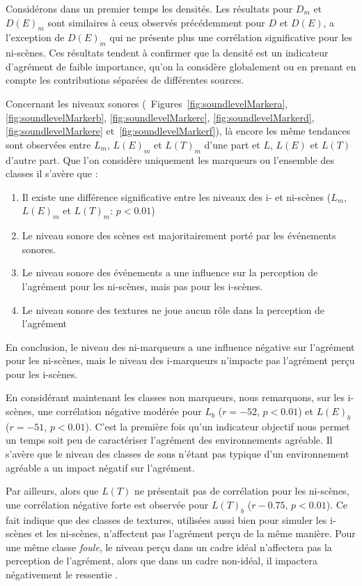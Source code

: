 Considérons dans un premier temps les densités. Les résultats pour $D_m$ et $D(E)_m$ sont similaires à ceux observés précédemment pour $D$ et $D(E)$, a l'exception de $D(E)_m$  qui ne présente plus une corrélation significative pour les ni-scènes. Ces résultats tendent à confirmer que la densité est un indicateur d'agrément de faible importance, qu'on la considère globalement ou en prenant en compte les contributions séparées de différentes sources.


Concernant les niveaux sonores (\Cf~Figures~\ref{fig:soundlevelMarkera}, \ref{fig:soundlevelMarkerb}, \ref{fig:soundlevelMarkerc}, \ref{fig:soundlevelMarkerd}, \ref{fig:soundlevelMarkere} et~\ref{fig:soundlevelMarkerf}), là encore les même tendances sont observées entre $L_m$, $L(E)_m$ et $L(T)_m$ d'une part et $L$, $L(E)$ et $L(T)$ d'autre part. Que l'on considère uniquement les marqueurs ou l'ensemble des classes il s'avère que :

\begin{enumerate}
\item Il existe une différence significative entre les niveaux des i- et ni-scènes ($L_m$, $L(E)_m$ et $L(T)_m$: $p<0.01$) 
\item Le niveau sonore des scènes est majoritairement porté par les événements sonores.
\item Le niveau sonore des événements a une influence sur la perception de l'agrément pour les ni-scènes, mais pas pour les i-scènes.
\item Le niveau sonore des textures ne joue aucun rôle dans la perception de l'agrément
\end{enumerate}

En conclusion, le niveau des ni-marqueurs a une influence négative sur l'agrément pour les ni-scènes, mais le niveau des i-marqueurs n’impacte pas l'agrément perçu pour les i-scènes.

En considérant maintenant les classes non marqueurs, nous remarquons, sur les i-scènes, une corrélation négative modérée pour $L_b$  ($r=-52$, $p<0.01$) et $L(E)_b$ ($r=-51$, $p<0.01$). C'est la première fois qu'un indicateur objectif nous permet un temps soit peu de caractériser l'agrément des environnements agréable. Il s'avère que le niveau des classes de sons n'étant pas typique d'un environnement agréable a un impact négatif sur l'agrément. 

Par ailleurs, alors que $L(T)$ ne présentait pas de corrélation pour les ni-scènes, une corrélation négative forte est observée pour $L(T)_b$ ($r-0.75$, $p<0.01$). Ce fait indique que des classes de textures, utilisées aussi bien pour simuler les i-scènes et les ni-scènes, n'affectent pas l'agrément perçu de la même manière. Pour une même classe \emph{foule}, le niveau perçu dans un cadre idéal n'affectera pas la perception de l'agrément, alors que dans un cadre non-idéal, il impactera négativement le ressentie .

